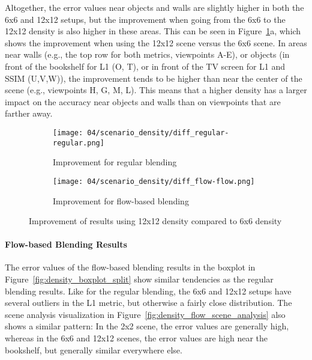 Altogether, the error values near objects and walls are slightly higher in both the 6x6 and 12x12 setups, but the improvement when going from the 6x6 to the 12x12 density is also higher in these areas. This can be seen in Figure~\ref{fig:dens_diff_6x6_12x12}a, which shows the improvement when using the 12x12 scene versus the 6x6 scene. In areas near walls (e.g., the top row for both metrics, viewpoints A-E), or objects (in front of the bookshelf for L1 (O, T), or in front of the TV screen for L1 and SSIM (U,V,W)), the improvement tends to be higher than near the center of the scene (e.g., viewpoints H, G, M, L).
This means that a higher density has a larger impact on the accuracy near objects and walls than on viewpoints that are farther away.

\begin{figure}
\centering
    \hfill
    \begin{subfigure}[b]{0.45\textwidth}
            \centering
            \texttt{[image: 04/scenario\_density/diff\_regular-regular.png]}
            \caption{Improvement for regular blending}
    \end{subfigure}
    \hfill
    \begin{subfigure}[b]{0.45\textwidth}
            \centering
            \texttt{[image: 04/scenario\_density/diff\_flow-flow.png]}
            \caption{Improvement for flow-based blending}
    \end{subfigure}
    \hfill
  \caption{Improvement of results using 12x12 density compared to 6x6 density} \label{fig:dens_diff_6x6_12x12}
\end{figure}


\paragraph{Flow-based Blending Results}
The error values of the flow-based blending results in the boxplot in Figure~\ref{fig:density_boxplot_split} show similar tendencies as the regular blending results. Like for the regular blending, the 6x6 and 12x12 setups have several outliers in the L1 metric, but otherwise a fairly close distribution. The scene analysis visualization in Figure~\ref{fig:density_flow_scene_analysis} also shows a similar pattern: In the 2x2 scene, the error values are generally high, whereas in the 6x6 and 12x12 scenes, the error values are high near the bookshelf, but generally similar everywhere else.

